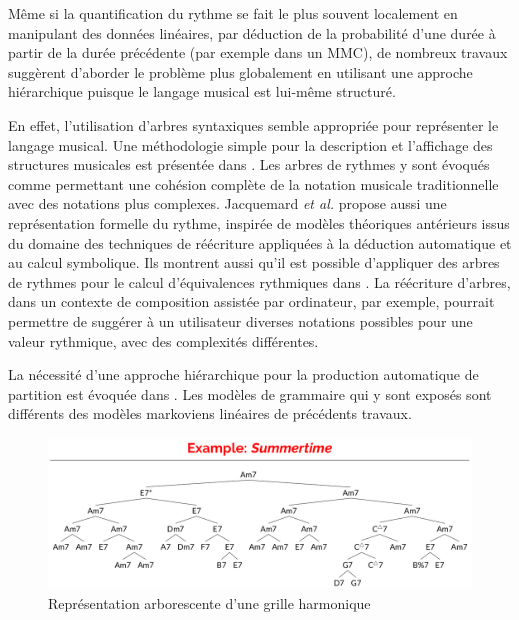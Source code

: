 Même si la quantification du rythme se fait le plus souvent localement en
manipulant des données linéaires, par déduction de la probabilité d'une durée à
partir de la durée précédente (par exemple dans un MMC), de nombreux travaux
suggèrent d’aborder le problème plus globalement en utilisant une approche
hiérarchique puisque le langage musical est lui-même structuré.

En effet, l’utilisation d’arbres syntaxiques semble appropriée pour représenter
le langage musical. Une méthodologie simple pour la description et l'affichage
des structures musicales est présentée dans \cite{rythm_tree}. Les arbres de
rythmes y sont évoqués comme permettant une cohésion complète de la notation
musicale traditionnelle avec des notations plus complexes. Jacquemard
\textit{et al.} \cite{jacquemard:hal-01134096} propose aussi une représentation
formelle du rythme, inspirée de modèles théoriques antérieurs issus du domaine
des techniques de réécriture appliquées à la déduction automatique et au calcul
symbolique. Ils montrent aussi qu'il est possible d'appliquer des arbres de
rythmes pour le calcul d'équivalences rythmiques dans
\cite{jacquemard:hal-01403982}. La réécriture d’arbres, dans un contexte de
composition assistée par ordinateur, par exemple, pourrait permettre de
suggérer à un utilisateur diverses notations possibles pour une valeur
rythmique, avec des complexités différentes.

La nécessité d’une approche hiérarchique pour la production automatique de
partition est évoquée dans \cite{foscarin:hal-01988990}. 
Les modèles de grammaire qui y sont exposés sont différents des modèles
markoviens linéaires de précédents travaux.\\
\begin{figure}[h]
	\centering
	\includegraphics[height=40mm, width=120mm]{
    z_images/2_etat_de_l_art/1_summertime_tree.png}
    \caption{Représentation arborescente d’une grille harmonique
    \protect\cite{harasimjazz}}
    \label{arbre_harmo}
\end{figure}

